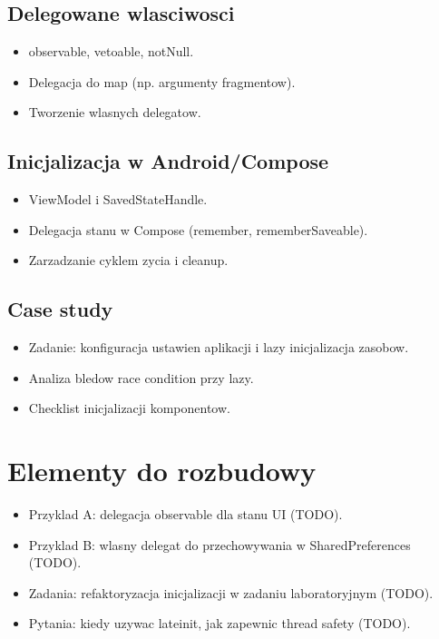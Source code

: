\subsection{Delegowane wlasciwosci}
\begin{itemize}
  \item observable, vetoable, notNull.
  \item Delegacja do map (np. argumenty fragmentow).
  \item Tworzenie wlasnych delegatow.
\end{itemize}

\subsection{Inicjalizacja w Android/Compose}
\begin{itemize}
  \item ViewModel i SavedStateHandle.
  \item Delegacja stanu w Compose (remember, rememberSaveable).
  \item Zarzadzanie cyklem zycia i cleanup.
\end{itemize}

\subsection{Case study}
\begin{itemize}
  \item Zadanie: konfiguracja ustawien aplikacji i lazy inicjalizacja zasobow.
  \item Analiza bledow race condition przy lazy.
  \item Checklist inicjalizacji komponentow.
\end{itemize}

\section{Elementy do rozbudowy}
\begin{itemize}
  \item Przyklad A: delegacja observable dla stanu UI (TODO).
  \item Przyklad B: wlasny delegat do przechowywania w SharedPreferences (TODO).
  \item Zadania: refaktoryzacja inicjalizacji w zadaniu laboratoryjnym (TODO).
  \item Pytania: kiedy uzywac lateinit, jak zapewnic thread safety (TODO).
\end{itemize}


